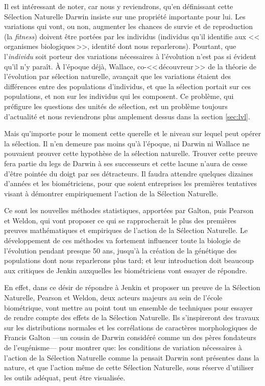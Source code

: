 	Il est intéressant de noter, car nous y reviendrons, qu'en définissant cette Sélection Naturelle Darwin insiste sur une propriété importante pour lui. Les variations qui vont, ou non, augmenter les chances de survie et de reproduction (la \emph{fitness}) doivent être portées par les individus (individus qu'il identifie aux <<\,organismes biologiques\,>>, identité dont nous reparlerons). Pourtant, que l'\emph{individu} soit porteur des variations nécessaires à l'évolution n'est pas si évident qu'il n'y paraît. À l'époque déjà, Wallace, co-<<\,découvreur\,>> de la théorie de l'évolution par sélection naturelle, avançait que les variations étaient des différences entre des populations d'individus, et que la sélection portait sur ces populations, et non sur les individus qui les composent. Ce problème, qui préfigure les questions des unités de sélection, est un problème toujours d'actualité et nous reviendrons plus amplement dessus dans la section \ref{sec:lvl}. 

Mais qu'importe pour le moment cette querelle et le niveau sur lequel peut opérer la sélection. Il n'en demeure pas moins qu'à l'époque, ni Darwin ni Wallace ne pouvaient prouver cette hypothèse de la sélection naturelle. Trouver cette preuve fera partie du legs de Darwin à ses successeurs et cette lacune n'aura de cesse d'être pointée du doigt par ses détracteurs. Il faudra attendre quelques dizaines d'années et les biométriciens, pour que soient entreprises les premières tentatives visant à démontrer empiriquement l'action de la Sélection Naturelle.

Ce sont les nouvelles méthodes statistiques, apportées par Galton, puis Pearson et Weldon, qui vont proposer ce qui se rapprocherait le plus des premières preuves mathématiques et empiriques de l'action de la Sélection Naturelle. Le développement de ces méthodes va fortement influencer toute la biologie de l'évolution pendant presque 50 ans, jusqu'à la création de la génétique des populations dont nous reparlerons plus tard; et leur introduction doit beaucoup aux critiques de Jenkin auxquelles les biométriciens vont essayer de répondre.

En effet, dans ce désir de répondre à Jenkin et proposer un preuve de la Sélection Naturelle, Pearson et Weldon, deux acteurs majeurs au sein de l'école biométrique, vont mettre au point tout un ensemble de techniques pour essayer de rendre compte des effets de la Sélection Naturelle. Ils s'inspireront des travaux sur les distributions normales et les corrélations de caractères morphologiques de Francis Galton ---un cousin de Darwin considéré comme un des pères fondateurs de l'eugénisme--- pour montrer que: les conditions de variation nécessaires à l'action de la Sélection Naturelle comme la pensait Darwin sont présentes dans la nature, et que l'action même de cette Sélection Naturelle, sous réserve d'utiliser les outils adéquat, peut être visualisée. 


